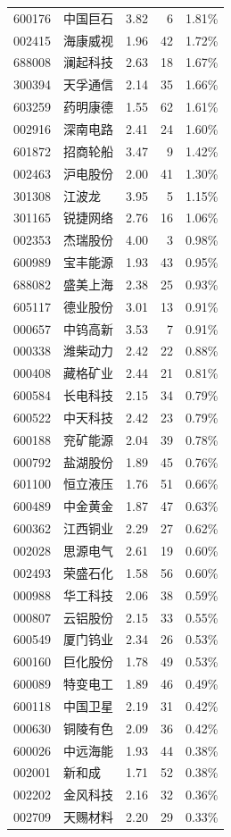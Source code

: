 \documentclass[11pt,a4paper]{article}
\begin{document}
{\begin{longtable}{@{}llrrr@{}}
600176 & 中国巨石 & 3.82 & 6 & 1.81\% \\
002415 & 海康威视 & 1.96 & 42 & 1.72\% \\
688008 & 澜起科技 & 2.63 & 18 & 1.67\% \\
300394 & 天孚通信 & 2.14 & 35 & 1.66\% \\
603259 & 药明康德 & 1.55 & 62 & 1.61\% \\
002916 & 深南电路 & 2.41 & 24 & 1.60\% \\
601872 & 招商轮船 & 3.47 & 9 & 1.42\% \\
002463 & 沪电股份 & 2.00 & 41 & 1.30\% \\
301308 & 江波龙 & 3.95 & 5 & 1.15\% \\
301165 & 锐捷网络 & 2.76 & 16 & 1.06\% \\
002353 & 杰瑞股份 & 4.00 & 3 & 0.98\% \\
600989 & 宝丰能源 & 1.93 & 43 & 0.95\% \\
688082 & 盛美上海 & 2.38 & 25 & 0.93\% \\
605117 & 德业股份 & 3.01 & 13 & 0.91\% \\
000657 & 中钨高新 & 3.53 & 7 & 0.91\% \\
000338 & 潍柴动力 & 2.42 & 22 & 0.88\% \\
000408 & 藏格矿业 & 2.44 & 21 & 0.81\% \\
600584 & 长电科技 & 2.15 & 34 & 0.79\% \\
600522 & 中天科技 & 2.42 & 23 & 0.79\% \\
600188 & 兖矿能源 & 2.04 & 39 & 0.78\% \\
000792 & 盐湖股份 & 1.89 & 45 & 0.76\% \\
601100 & 恒立液压 & 1.76 & 51 & 0.66\% \\
600489 & 中金黄金 & 1.87 & 47 & 0.63\% \\
600362 & 江西铜业 & 2.29 & 27 & 0.62\% \\
002028 & 思源电气 & 2.61 & 19 & 0.60\% \\
002493 & 荣盛石化 & 1.58 & 56 & 0.60\% \\
000988 & 华工科技 & 2.06 & 38 & 0.59\% \\
000807 & 云铝股份 & 2.15 & 33 & 0.55\% \\
600549 & 厦门钨业 & 2.34 & 26 & 0.53\% \\
600160 & 巨化股份 & 1.78 & 49 & 0.53\% \\
600089 & 特变电工 & 1.89 & 46 & 0.49\% \\
600118 & 中国卫星 & 2.19 & 31 & 0.42\% \\
000630 & 铜陵有色 & 2.09 & 36 & 0.42\% \\
600026 & 中远海能 & 1.93 & 44 & 0.38\% \\
002001 & 新和成 & 1.71 & 52 & 0.38\% \\
002202 & 金风科技 & 2.16 & 32 & 0.36\% \\
002709 & 天赐材料 & 2.20 & 29 & 0.33\% \\
\bottomrule
\end{longtable}
}
\end{document}
